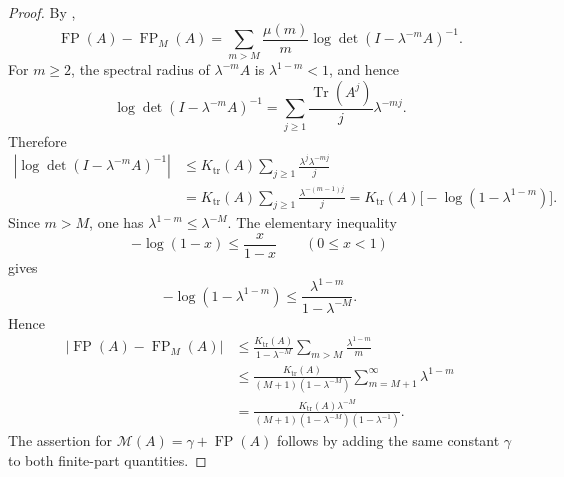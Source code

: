 \documentclass[11pt,a4paper]{amsart}
\theoremstyle{plain}
\theoremstyle{definition}
\theoremstyle{remark}
\DeclareMathOperator{\Tr}{Tr}
\DeclareMathOperator{\FP}{FP}
\begin{document}
\begin{proof}
  By ,
  \[
    \FP(A)-\FP_M(A)
    =
    \sum_{m>M}\frac{\mu(m)}{m}
      \log\det(I-\lambda^{-m}A)^{-1}.
  \]
  For \(m\ge2\), the spectral radius of \(\lambda^{-m}A\) is
  \(\lambda^{1-m}<1\), and hence
  \[
    \log\det(I-\lambda^{-m}A)^{-1}
    =
    \sum_{j\ge1}\frac{\Tr(A^j)}{j}\lambda^{-mj}.
  \]
  Therefore
  \[
  \begin{aligned}
    \left|
      \log\det(I-\lambda^{-m}A)^{-1}
    \right|
    &\le
    K_{\mathrm{tr}}(A)
      \sum_{j\ge1}\frac{\lambda^j\lambda^{-mj}}{j}  \\
    &=
    K_{\mathrm{tr}}(A)
      \sum_{j\ge1}\frac{\lambda^{-(m-1)j}}{j}
    =
    K_{\mathrm{tr}}(A)\bigl[-\log(1-\lambda^{1-m})\bigr].
  \end{aligned}
  \]
  Since \(m>M\), one has \(\lambda^{1-m}\le\lambda^{-M}\). The
  elementary inequality
  \[
    -\log(1-x)\le \frac{x}{1-x}\qquad(0\le x<1)
  \]
  gives
  \[
    -\log(1-\lambda^{1-m})
    \le
    \frac{\lambda^{1-m}}{1-\lambda^{-M}}.
  \]
  Hence
  \[
  \begin{aligned}
    |\FP(A)-\FP_M(A)|
    &\le
    \frac{K_{\mathrm{tr}}(A)}{1-\lambda^{-M}}
      \sum_{m>M}\frac{\lambda^{1-m}}{m} \\
    &\le
    \frac{K_{\mathrm{tr}}(A)}{(M+1)(1-\lambda^{-M})}
      \sum_{m=M+1}^{\infty}\lambda^{1-m}  \\
    &=
    \frac{K_{\mathrm{tr}}(A)\lambda^{-M}}
      {(M+1)(1-\lambda^{-M})(1-\lambda^{-1})}.
  \end{aligned}
  \]
  The assertion for \(\mathcal M(A)=\gamma+\FP(A)\) follows by adding
  the same constant \(\gamma\) to both finite-part quantities.
\end{proof}
\end{document}
